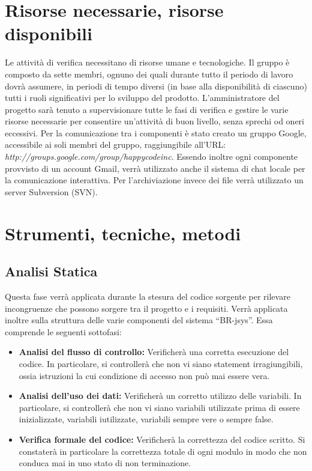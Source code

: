 \documentclass[11pt,titlepage,a4paper]{report}
\begin{document}
\section{Risorse necessarie, risorse disponibili}
Le attivit\`a di verifica necessitano di risorse umane e tecnologiche. Il gruppo \`e composto da sette membri, ognuno dei quali durante tutto il periodo di lavoro dovr\`a assumere, in periodi di tempo diversi (in base alla disponibilit\`a di ciascuno) tutti i ruoli significativi per lo sviluppo del prodotto. L'amministratore del progetto sar\`a tenuto a supervisionare tutte le fasi di verifica e gestire le varie risorse necessarie per consentire un'attivit\`a di buon livello, senza sprechi od oneri eccessivi. Per la comunicazione tra i componenti \`e stato creato un gruppo Google, accessibile ai soli membri del gruppo, raggiungibile all'URL: \textit{http://groups.google.com/group/happycodeinc}. Essendo inoltre ogni componente provvisto di un account Gmail, verr\`a utilizzato anche il sistema di chat locale per la comunicazione interattiva. Per l'archiviazione invece dei file verr\`a utilizzato un server Subversion (SVN).

\section{Strumenti, tecniche, metodi}
\subsection{Analisi Statica}
Questa fase verr\`a applicata durante la stesura del codice sorgente per rilevare incongruenze che possono sorgere tra il progetto e i requisiti. Verr\`a applicata inoltre sulla struttura delle varie componenti del sistema ``BR-jsys''. Essa comprende le seguenti sottofasi:
\begin{itemize}
\item \textbf{Analisi del flusso di controllo:} Verificher\`a una corretta esecuzione del codice.
In particolare, si controller\`a che non vi siano statement irragiungibili, ossia istruzioni la cui condizione di accesso non pu\`o mai essere vera.
\item \textbf{Analisi dell'uso dei dati:} Verificher\`a un corretto utilizzo delle variabili.
In particolare, si controller\`a che non vi siano variabili utilizzate prima di essere inizializzate, variabili iutilizzate, variabili sempre vere o sempre false.
\item \textbf{Verifica formale del codice:} Verificher\`a la correttezza del codice scritto. Si constater\`a in particolare la correttezza totale di ogni modulo in modo che non conduca mai in uno stato di non terminazione.
\end{itemize}
\end{document}
